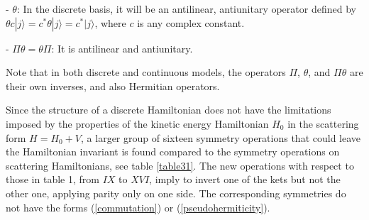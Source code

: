 - $\theta$: In the discrete basis, it will be an antilinear, antiunitary  operator defined by  $\theta c |j\rangle =c^{*} \theta |j\rangle =c^{*}|j\rangle $, where $c$ is any complex constant.



- $\Pi\theta=\theta\Pi$:  It is antilinear and antiunitary.



Note that in both discrete and continuous models, the operators $\Pi$, $\theta$, and $\Pi\theta$ are their own inverses, and also Hermitian operators.

Since the structure of a discrete Hamiltonian does not have the limitations imposed by the properties of the kinetic energy Hamiltonian $H_{0}$ in the scattering form $H=H_{0}+V$,
a larger group of sixteen symmetry operations that could leave the Hamiltonian invariant
is found compared to the
symmetry operations on scattering Hamiltonians, see table \ref{table31}.
%
%
The  new operations with respect to those in  table 1, from $IX$ to $XVI$, imply to  invert  one of the kets but not the other one, applying parity only on one side. The corresponding symmetries do not have the forms (\ref{commutation}) or (\ref{pseudohermiticity}).





